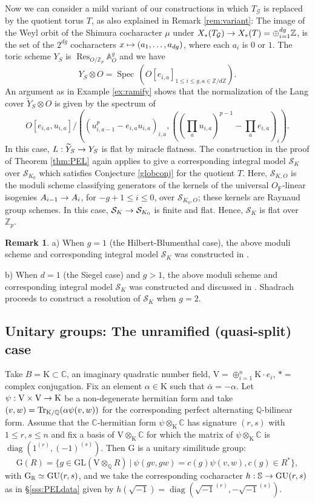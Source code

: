 \documentclass[reqno, 10pt]{amsart}
\makeatletter
\newcommand{\BA}{\ensuremath{\mathbb {A}}\xspace}
\newcommand{\BC}{\ensuremath{\mathbb {C}}\xspace}
\newcommand{\BQ}{\ensuremath{\mathbb {Q}}\xspace}
\newcommand{\BR}{\ensuremath{\mathbb {R}}\xspace}
\newcommand{\BS}{\ensuremath{\mathbb {S}}\xspace}
\newcommand{\BZ}{\ensuremath{\mathbb {Z}}\xspace}
\newcommand{\CG}{\ensuremath{\mathcal {G}}\xspace}
\newcommand{\CS}{\ensuremath{\mathcal {S}}\xspace}
\newcommand{\RF}{\ensuremath{\mathrm {F}}\xspace}
\newcommand{\RG}{\ensuremath{\mathrm {G}}\xspace}
\newcommand{\RK}{\ensuremath{\mathrm {K}}\xspace}
\newcommand{\RV}{\ensuremath{\mathrm {V}}\xspace}
\DeclareMathOperator{\diag}{diag}
\newcommand{\GL}{\mathrm{GL}}
\DeclareMathOperator{\Res}{Res}
\DeclareMathOperator{\Spec}{Spec\,}
\newcommand{\wt}{\widetilde}
\theoremstyle{definition}
\newtheorem{remark}[subsubsection]{Remark}
\numberwithin{equation}{subsection}
\numberwithin{subsubsection}{subsection}
\renewcommand{\to}{%
   \ifbool{@display}{\longrightarrow}{\rightarrow}%
   }
\let\shortmapsto\mapsto
\renewcommand{\mapsto}{%
   \ifbool{@display}{\shortmapsto}{\shortmapsto}%
   }
\makeatother
\begin{document}
Now we can consider a mild variant of our constructions in which $T_\CG$ is replaced by the quotient torus $T$, as also explained 
in Remark \ref{rem:variant}: The image of the Weyl orbit of the Shimura cocharacter $\mu$ under $X_*(T_\CG)\to X_*(T)=\oplus_{i=1}^{dg}\BZ$,
is the set of the $2^{dg}$ cocharacters $x\mapsto (a_1,\ldots, a_{dg})$, where each $a_i$ is $0$ or $1$. The toric scheme $Y_S$ is $\Res_{O/\BZ_p}\BA^g_O$ and we have 
\[
Y_S\otimes O=\Spec(O[e_{i,a}]_{1\leq i\leq g, a\in \BZ/d\BZ}).
\]
An argument as in Example \ref{ex:ramify} shows that the normalization of the Lang cover $\wt Y_S\otimes O$ is given by the spectrum of 
\[
 O[e_{i,a}, u_{i,a}] /((u_{i,a-1}^p-e_{i, a}u_{i, a})_{i, a}, ((\prod_{a} u_{i,a})^{p-1}-\prod_{a} e_{i,a})_i).
\]
In this case,  $L: \wt Y_S\to Y_S$ is flat by miracle flatness.  The construction in the proof of Theorem \ref{thm:PEL} again applies to give a corresponding integral model $\CS_K$ over $\CS_{K_0}$ which satisfies Conjecture \ref{globconj} for the quotient $T$. Here,   $\CS_{K, O}$  
 is the moduli scheme classifying generators of the kernels of the universal $O_\RF$-linear isogenies $A_{i-1}\to A_i$, for $-g+1\leq i\leq 0$,
 over $\CS_{K_0, O}$; these kernels are Raynaud group schemes. In this case, $\CS_{K}\to \CS_{K_0}$ is finite and flat. Hence, $\CS_K$ is flat over 
 $\BZ_p$. 
 
 \begin{remark}\label{remarkHB}
 a) When $g=1$ (the Hilbert-Blumenthal case), the above moduli scheme and corresponding integral model $\CS_{K}$ was constructed in \cite{P95}.
 
 b) When $d=1$ (the Siegel case) and $g>1$, the above moduli scheme and corresponding integral model $\CS_{K}$ was constructed and discussed in \cite[\S 4.1]{Shadrach}. Shadrach proceeds to construct a resolution of $\CS_K$ when $g=2$.
\end{remark}

  
 

\subsection{Unitary groups: The unramified (quasi-split)  case}

Take $B=\RK\subset \BC$, an imaginary quadratic number field, $\RV=\oplus_{i=1}^n \RK\cdot e_i$, $*=$ complex conjugation. 
Fix an element $\alpha\in \RK$ such that $\bar\alpha=-\alpha$. Let $\psi: \RV\times \RV\to \RK$ be a non-degenerate hermitian form and take $(v, w)={\rm Tr}_{\RK/\BQ}(\alpha \psi(v,w))$ for the corresponding perfect alternating $\BQ$-bilinear form. Assume that the $\BC$-hermitian form $\psi\otimes_\RK\BC$ has signature $(r,s)$ with $1\leq r,s\leq n$ and fix a basis of $\RV\otimes_\RK\BC$ for which the matrix of $\psi\otimes_\RK\BC$ is $\diag( 1^{(r)}, (-1)^{(s)})$. Then $\RG$ is a unitary similitude group:
\[
\RG(R)=\{g\in \GL(\RV\otimes_\BQ R)\ |\ \psi(gv,gw)=c(g)\psi(v,w), c(g)\in R^*\},
\]
with $\RG_\BR\simeq {\rm GU}(r,s)$, and we  take the corresponding cocharacter $h: \BS\to {\rm GU}(r,s)$ as in \S \ref{sss:PELdata}  given by $h(\sqrt{-1})=\diag(\sqrt{-1}^{(r)}, -\sqrt{-1}^{(s)})$.  
\end{document}

